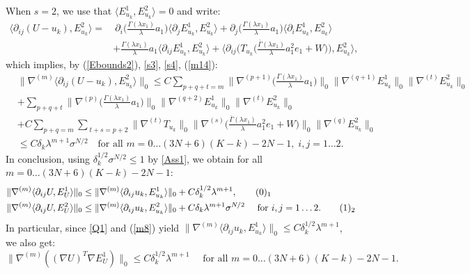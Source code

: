 \documentclass[reqno,twoside,11pt]{amsart}
\numberwithin{equation}{section}
\theoremstyle{plain}
\theoremstyle{definition}
\begin{document}
When $s=2$, we use that $\langle E^1_{u_k}, E^2_{u_k}\rangle=0$ and write:
\begin{equation*}
\begin{split}
\langle\partial_{ij}(U-u_k), E^2_{u_k} \rangle = & ~\partial_i
\Big(\frac{\Gamma(\lambda x_1)}{\lambda} a_1\Big)\langle \partial_jE^1_{u_k},
E^2_{u_k}\rangle + \partial_j\Big(\frac{\Gamma(\lambda x_1)}{\lambda} a_1\Big)\langle \partial_iE^1_{u_k},
E^2_{u_k}\rangle \\ & + \frac{\Gamma(\lambda x_1)}{\lambda} a_1\langle \partial_{ij}E^1_{u_k},
E^2_{u_k}\rangle + \Big\langle \partial_{ij}\Big(T_{u_k}\Big(\frac{\bar\Gamma(\lambda
  x_1)}{\lambda}a_1^2e_1+W\Big)\Big), E^2_{u_k}\Big\rangle,
\end{split}
\end{equation*}
which implies, by (\ref{Ebounds2}), \ref{s3}, \ref{s4}, (\ref{m14}):
\begin{equation*}
\begin{split}
& \|\nabla^{(m)}\langle\partial_{ij}(U-u_k), E^2_{u_k}\rangle\|_0 
\leq  C\sum_{p+q+t=m}\big\|\nabla^{(p+1)}\Big (\frac{\Gamma(\lambda
  x_1)}{\lambda}a_1\Big)\big\|_0 \|\nabla^{(q+1)}E^1_{u_k}\|_0\|\nabla^{(t)}E^2_{u_k}\|_0
\\ & +\sum_{p+q+t} \big\|\nabla^{(p)}\Big (\frac{\Gamma(\lambda
  x_1)}{\lambda}a_1\Big)\big\|_0 \|\nabla^{(q+2)}E^1_{u_k}\|_0\|\nabla^{(t)}E^2_{u_k}\|_0
\\ & + C\sum_{p+q=m}\sum_{~t+s=p+2}\|\nabla^{(t)}T_{u_k}\|_0
\big\|\nabla^{(s)}\Big (\frac{\bar\Gamma(\lambda x_1)}{\lambda}a_1^2e_1 +
W\Big)\big\|_0\|\nabla^{(q)}E^2_{u_k}\|_0
\\ & \leq  C\delta_k\lambda^{m+1} \sigma^{N/2}\quad\mbox{for all }
m=0\ldots (3N+6)(K-k)-2N-1,\; i,j=1\ldots 2.
\end{split}
\end{equation*}
In conclusion, using $\delta_k^{1/2}\sigma^{N/2}\leq 1$ by
\ref{Ass1}, we obtain for all $m=0\ldots (3N+6)(K-k)-2N-1$:
\begin{align*}
&  \|\nabla^{(m)}\langle \partial_{ij}U, E^1_{U}\rangle\|_0  \leq
\|\nabla^{(m)}\langle \partial_{ij}u_k, E^1_{u_k}\rangle\|_0 +
C\delta_k^{1/2}\lambda^{m+1},
\tag*{(\theequation)$_1$}\refstepcounter{equation} \label{Q1U} \\
& \|\nabla^{(m)}\langle \partial_{ij}U, E^2_{U}\rangle\|_0 \leq
\|\nabla^{(m)}\langle \partial_{ij}u_k, E^2_{u_k}\rangle\|_0 + C\delta_k\lambda^{m+1}\sigma^{N/2}
\quad\mbox{ for } i,j=1\ldots 2.
\tag*{(\theequation)$_2$} \label{Q2U} 
\end{align*}
In particular, since \ref{Q1} and (\ref{m8}) yield
$\|\nabla^{(m)}\langle \partial_{ij}u_k, E^1_{u_k}\rangle\|_0 \leq
C\delta_k^{1/2}\lambda^{m+1}$,  we also get:
\begin{equation}\label{Q1Ugr}
\|\nabla^{(m)}((\nabla U)^T\nabla
E_{U}^1)\|_0\leq C\delta_k^{1/2}\lambda^{m+1} \quad\mbox{ for all } m=0\ldots (3N+6)(K-k)-2N-1.
\end{equation}
\end{document}
